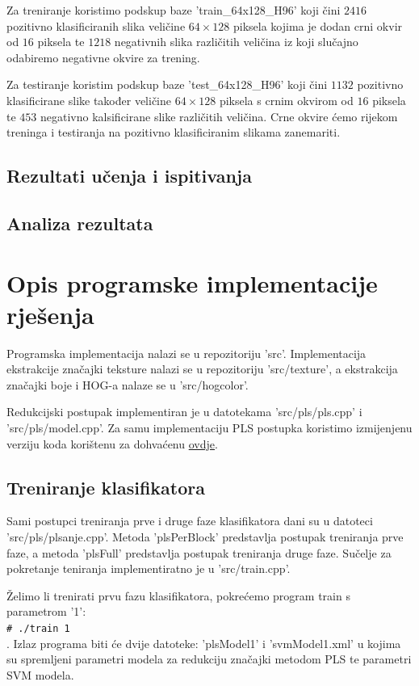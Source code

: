\documentclass[seminar]{fer}
\newcommand{\shellcmd}[1]{\\\indent\indent\texttt{\footnotesize\# #1}\\}
\begin{document}
Za treniranje koristimo podskup baze 'train\_64x128\_H96' koji čini $2416$ pozitivno klasificiranih slika veličine $64 \times 128$ piksela kojima je dodan crni okvir od $16$ piksela te $1218$ negativnih slika različitih veličina iz koji slučajno odabiremo negativne okvire za trening. 

Za testiranje koristim podskup baze 'test\_64x128\_H96' koji čini $1132$ pozitivno klasificirane slike također veličine $64 \times 128$ piksela s crnim okvirom od $16$ piksela te $453$ negativno kalsificirane slike različitih veličina. Crne okvire ćemo rijekom treninga i testiranja na pozitivno klasificiranim slikama zanemariti.


\section{Rezultati učenja i ispitivanja}

\section{Analiza rezultata}

\chapter{Opis programske implementacije rješenja}
Programska implementacija nalazi se u repozitoriju 'src'. Implementacija ekstrakcije značajki teksture nalazi se u repozitoriju 'src/texture', a ekstrakcija značajki boje i HOG-a nalaze se u 'src/hogcolor'. 

Redukcijski postupak implementiran je u datotekama 'src/pls/pls.cpp' i 'src/pls/model.cpp'. Za samu implementaciju PLS postupka koristimo izmijenjenu verziju koda korištenu za \cite{Schwartz} dohvaćenu   \href{http://homepages.dcc.ufmg.br/~william/softwares.html#PLSNipals}{ovdje}.

\section{Treniranje klasifikatora}

Sami postupci treniranja prve i druge faze klasifikatora dani su u datoteci 'src/pls/plsanje.cpp'. Metoda 'plsPerBlock' predstavlja postupak treniranja prve faze, a metoda 'plsFull' predstavlja postupak treniranja druge faze. Sučelje za pokretanje teniranja implementiratno je u 'src/train.cpp'.	

Želimo li trenirati prvu fazu klasifikatora, pokrećemo program train s parametrom '1': \shellcmd{./train 1}. 
Izlaz programa biti će dvije datoteke: 'plsModel1' i 'svmModel1.xml' u kojima su spremljeni parametri modela za redukciju značajki metodom PLS te parametri SVM modela.
\end{document}
